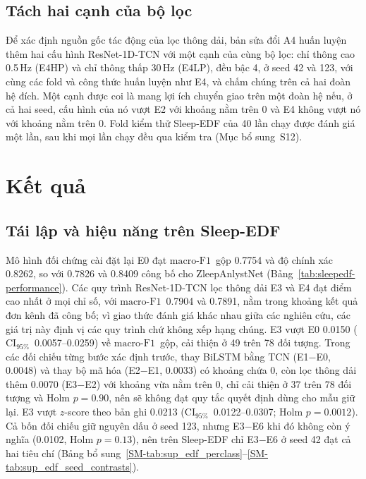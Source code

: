 \documentclass[11pt,a4paper]{article}
\newcommand{\mf}{\ensuremath{\mathrm{macro\text{-}F1}}}
\newcommand{\ci}{\ensuremath{\mathrm{CI}_{95\%}}}
\begin{document}
\subsection{Tách hai cạnh của bộ lọc}

Để xác định nguồn gốc tác động của lọc thông dải, bản sửa đổi A4 huấn luyện thêm hai cấu hình ResNet-1D-TCN
với một cạnh của cùng bộ lọc: chỉ thông cao 0.5\,Hz (E4HP) và chỉ thông thấp 30\,Hz (E4LP), đều bậc 4, ở seed
42 và 123, với cùng các fold và công thức huấn luyện như E4, và chấm chúng trên cả hai đoàn hệ đích. Một cạnh
được coi là mang lợi ích chuyển giao trên một đoàn hệ nếu, ở cả hai seed, cấu hình của nó vượt E2 với khoảng
nằm trên 0 và E4 không vượt nó với khoảng nằm trên 0. Fold kiểm thử Sleep-EDF của 40 lần chạy được đánh giá một
lần, sau khi mọi lần chạy đều qua kiểm tra (Mục bổ sung~S12).

\section{Kết quả}

\subsection{Tái lập và hiệu năng trên Sleep-EDF}

Mô hình đối chứng cài đặt lại E0 đạt \mf\ gộp 0.7754 và độ chính xác 0.8262, so với 0.7826 và 0.8409 công bố
cho ZleepAnlystNet (Bảng~\ref{tab:sleepedf-performance}). Các quy trình ResNet-1D-TCN lọc thông dải E3 và E4
đạt điểm cao nhất ở mọi chỉ số, với \mf\ 0.7904 và 0.7891, nằm trong khoảng kết quả đơn kênh đã công bố; vì giao
thức đánh giá khác nhau giữa các nghiên cứu, các giá trị này định vị các quy trình chứ không xếp hạng chúng. E3
vượt E0 0.0150 (\ci\ 0.0057--0.0259) về \mf\ gộp, cải thiện ở 49 trên 78 đối tượng. Trong các đối chiếu từng
bước xác định trước, thay BiLSTM bằng TCN (E1$-$E0, 0.0048) và thay bộ mã hóa (E2$-$E1, 0.0033) có khoảng chứa
0, còn lọc thông dải thêm 0.0070 (E3$-$E2) với khoảng vừa nằm trên 0, chỉ cải thiện ở 37 trên 78 đối tượng và
Holm $p=0.90$, nên sẽ không đạt quy tắc quyết định dùng cho mẫu giữ lại. E3 vượt $z$-score theo bản ghi 0.0213
(\ci\ 0.0122--0.0307; Holm $p=0.0012$). Cả bốn đối chiếu giữ nguyên dấu ở seed 123, nhưng E3$-$E6 khi đó không
còn ý nghĩa (0.0102, Holm $p=0.13$), nên trên Sleep-EDF chỉ E3$-$E6 ở seed 42 đạt cả hai tiêu chí (Bảng
bổ sung~\ref{SM-tab:sup_edf_perclass}--\ref{SM-tab:sup_edf_seed_contrasts}).
\end{document}
